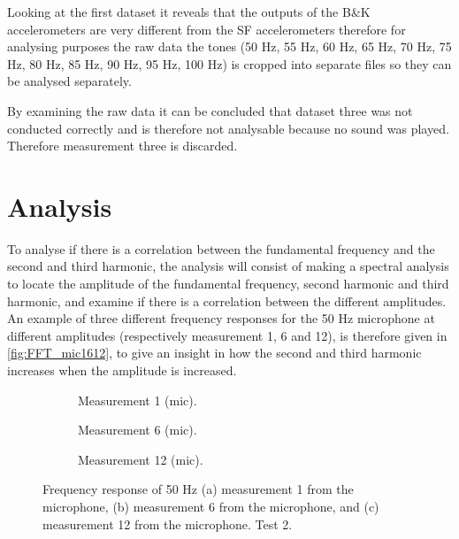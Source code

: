Looking at the first dataset it reveals that the outputs of the B\&K accelerometers are very different from the SF accelerometers therefore for analysing purposes the raw data the tones (50 Hz, 55 Hz, 60 Hz, 65 Hz, 70 Hz, 75 Hz, 80 Hz, 85 Hz, 90 Hz, 95 Hz, 100 Hz) is cropped into separate files so they can be analysed separately.

By examining the raw data it can be concluded that dataset three was not conducted correctly and is therefore not analysable because no sound was played. Therefore measurement three is discarded. 

\section{Analysis}
To analyse if there is a correlation between the fundamental frequency and the second and third harmonic, the analysis will consist of making a spectral analysis to locate the amplitude of the fundamental frequency, second harmonic and third harmonic, and examine if there is a correlation between the different amplitudes. An example of three different frequency responses for the 50 Hz microphone at different amplitudes (respectively measurement 1, 6 and 12), is therefore given in \autoref{fig:FFT_mic1612}, to give an insight in how the second and third harmonic increases when the amplitude is increased.

\begin{figure}[H]
\centering
\begin{subfigure}[t]{0.37\textwidth}
    
    \caption{Measurement 1 (mic).}
    \label{fig:FFT_mic1_50Hz}
\end{subfigure}
\begin{subfigure}[t]{0.28\textwidth}
    
    \caption{Measurement 6 (mic).}
    \label{fig:FFT_mic6_50Hz}
\end{subfigure}
\begin{subfigure}[t]{0.32\textwidth}
    
    \caption{Measurement 12 (mic).}
    \label{fig:FFT_mic1_50Hz}
\end{subfigure}
\caption{Frequency response of 50 Hz (a) measurement 1 from the microphone, (b) measurement 6 from the microphone, and (c) measurement 12 from the microphone. Test 2.}
\label{fig:FFT_mic1612}
\end{figure}   

